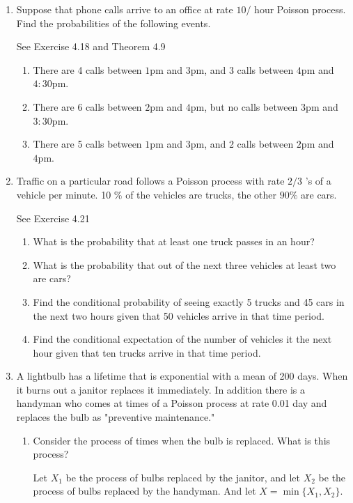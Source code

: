 \documentclass{article} %
\theoremstyle{plain}
\theoremstyle{case}
\begin{document}
\begin{enumerate}[label={\fbox{\textbf{Exercise \#\arabic* :}}}]
  \item Suppose that phone calls arrive to an office at rate $10 /$ hour Poisson process. Find the probabilities of the following events.

    See Exercise 4.18 and Theorem 4.9
    \begin{enumerate}
      \item  There are 4 calls between $1 \mathrm{pm}$ and $3 \mathrm{pm}$, and 3 calls between $4 \mathrm{pm}$ and $4: 30 \mathrm{pm}$.
      \item  There are 6 calls between $2 \mathrm{pm}$ and $4 \mathrm{pm}$, but no calls between $3 \mathrm{pm}$ and $3: 30 \mathrm{pm}$.
      \item  There are 5 calls between $1 \mathrm{pm}$ and $3 \mathrm{pm}$, and 2 calls between $2 \mathrm{pm}$ and $4 \mathrm{pm}$.
    \end{enumerate}
\newpage

  \item Traffic on a particular road follows a Poisson process with rate $2 / 3$ 's of a vehicle per minute. 10 $\%$ of the vehicles are trucks, the other $90 \%$ are cars.

    See Exercise 4.21
    \begin{enumerate}
      \item  What is the probability that at least one truck passes in an hour?
      \item  What is the probability that out of the next three vehicles at least two are cars?
      \item  Find the conditional probability of seeing exactly 5 trucks and 45 cars in the next two hours given that 50 vehicles arrive in that time period.
      \item Find the conditional expectation of the number of vehicles it the next hour given that ten trucks arrive in that time period.
    \end{enumerate}
\newpage

  \item A lightbulb has a lifetime that is exponential with a mean of 200 days. When it burns out a janitor replaces it immediately. In addition there is a handyman who comes at times of a Poisson process at rate 0.01 day and replaces the bulb as "preventive maintenance."
    \begin{enumerate}
      \item  Consider the process of times when the bulb is replaced. What is this process?

        Let $X_1$ be the process of bulbs replaced by the janitor, and
        let $X_2$ be the process of bulbs replaced by the handyman.  And
        let $X = \operatorname{min}\{X_1, X_2\}$.


\end{enumerate}
\end{enumerate}
\end{document}
